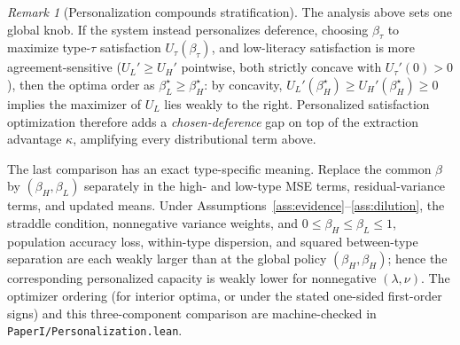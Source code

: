 \documentclass[11pt]{article}
\theoremstyle{definition}
\theoremstyle{remark}
\newtheorem{remark}[theorem]{Remark}
\numberwithin{equation}{section}
\begin{document}
\begin{remark}[Personalization compounds stratification]\label{rem:personal}
The analysis above sets one global knob. If the system instead personalizes deference, choosing $\beta_\tau$ to maximize type-$\tau$ satisfaction $U_\tau(\beta_\tau)$, and low-literacy satisfaction is more agreement-sensitive ($U_L' \ge U_H'$ pointwise, both strictly concave with $U_\tau'(0) > 0$), then the optima order as $\beta_L^\star \ge \beta_H^\star$: by concavity, $U_L'(\beta_H^\star) \ge U_H'(\beta_H^\star) \ge 0$ implies the maximizer of $U_L$ lies weakly to the right. Personalized satisfaction optimization therefore adds a \emph{chosen-deference} gap on top of the extraction advantage $\kappa$, amplifying every distributional term above.

The last comparison has an exact type-specific meaning. Replace the common
$\beta$ by $(\beta_H,\beta_L)$ separately in the high- and low-type MSE terms,
residual-variance terms, and updated means. Under Assumptions~\ref{ass:evidence}--\ref{ass:dilution}, the straddle condition, nonnegative variance weights, and
$0\le\beta_H\le\beta_L\le1$, population accuracy loss, within-type dispersion,
and squared between-type separation are each weakly larger than at the global
policy $(\beta_H,\beta_H)$; hence the corresponding personalized capacity is
weakly lower for nonnegative $(\lambda,\nu)$. The optimizer ordering (for
interior optima, or under the stated one-sided first-order signs) and this
three-component comparison are machine-checked in
\texttt{PaperI/Personalization.lean}.
\end{remark}
\end{document}

